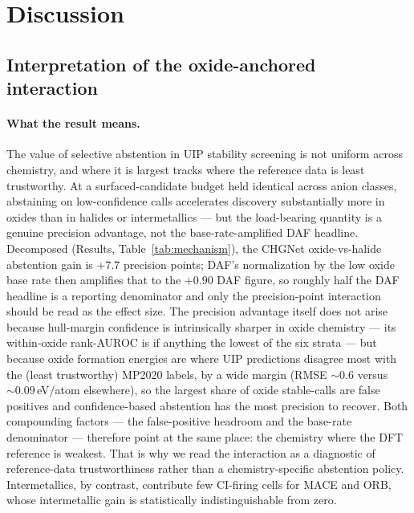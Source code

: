 \documentclass[aip,jcp,preprint,superscriptaddress,amsmath,amssymb]{revtex4-2}
\begin{document}
\section{Discussion}

\subsection{Interpretation of the oxide-anchored interaction}

\paragraph{What the result means.} The value of selective abstention in UIP stability
screening is not uniform across chemistry, and where it is largest tracks where the reference
data is least trustworthy. At a surfaced-candidate budget held identical across
anion classes, abstaining on low-confidence calls accelerates discovery substantially more
in oxides than in halides or intermetallics --- but the load-bearing quantity is a genuine
precision advantage, not the base-rate-amplified DAF headline. Decomposed (Results,
Table~\ref{tab:mechanism}), the CHGNet oxide-vs-halide abstention gain is $+7.7$ precision
points; DAF's normalization by the low oxide base rate then amplifies that to the $+0.90$ DAF
figure, so roughly half the DAF headline is a reporting denominator and only the precision-point
interaction should be read as the effect size. The precision advantage itself does not arise
because hull-margin confidence is intrinsically sharper in oxide chemistry --- its within-oxide
rank-AUROC is if anything the lowest of the six strata --- but because oxide formation energies
are where UIP predictions disagree most with the (least trustworthy) MP2020 labels, by a wide
margin (RMSE $\sim\!0.6$ versus $\sim\!0.09$\,eV/atom elsewhere), so the largest share of oxide
stable-calls are false positives and confidence-based abstention has the most precision to
recover. Both compounding factors --- the false-positive headroom and the base-rate denominator
--- therefore point at the same place: the chemistry where the DFT reference is weakest. That is
why we read the interaction as a diagnostic of reference-data trustworthiness rather than a
chemistry-specific abstention policy. Intermetallics, by
contrast, contribute few CI-firing cells for MACE and ORB, whose intermetallic gain is
statistically indistinguishable from zero.
\end{document}
